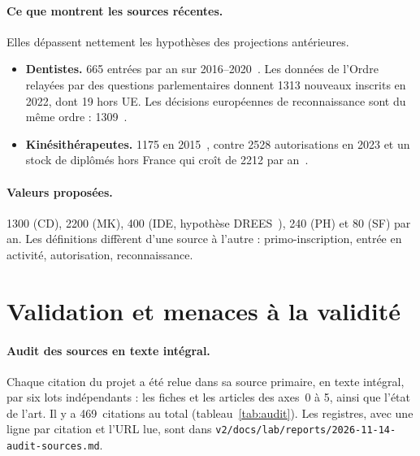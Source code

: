 \documentclass[11pt]{article}
\begin{document}
\paragraph{Ce que montrent les sources récentes.}
Elles dépassent nettement les hypothèses des projections antérieures.
\begin{itemize}
\item \textbf{Dentistes.} \num{665} entrées par an sur 2016--2020~\cite{dd76}.
  Les données de l'Ordre relayées par des questions parlementaires donnent
  \num{1313} nouveaux inscrits en 2022, dont 19 hors UE. Les décisions
  européennes de reconnaissance sont du même ordre :
  \num{1309}~\cite{regprof}.
\item \textbf{Kinésithérapeutes.} \num{1175} en 2015~\cite{er1075}, contre
  \num{2528} autorisations en 2023 et un stock de diplômés hors France qui
  croît de \num{2212}\derive{} par an~\cite{cnomk2024}.
\end{itemize}

\paragraph{Valeurs proposées.}
\num{1300} (CD), \num{2200}\derive{} (MK), 400 (IDE, hypothèse
DREES~\cite{er1319}), 240\derive{} (PH) et 80\derive{} (SF) par an. Les
définitions diffèrent d'une source à l'autre : primo-inscription, entrée
en activité, autorisation, reconnaissance.

\section{Validation et menaces à la validité}

\paragraph{Audit des sources en texte intégral.}
Chaque citation du projet a été relue dans sa source primaire, en texte
intégral, par six lots indépendants : les fiches et les articles des
axes~0 à 5, ainsi que l'état de l'art. Il y a 469~citations au total
(tableau~\ref{tab:audit}). Les registres, avec une ligne par citation et
l'URL lue, sont dans \texttt{v2/docs/lab/reports/2026-11-14-audit-sources.md}.
\end{document}
